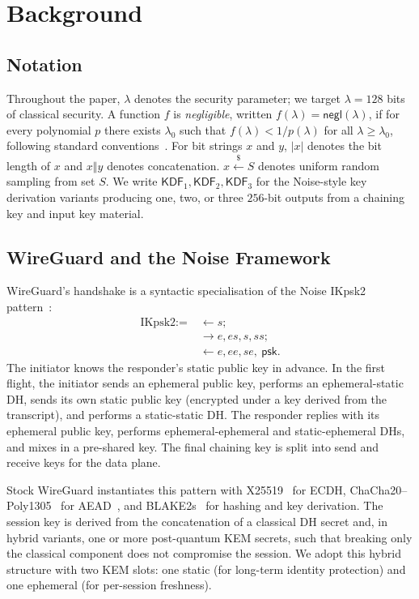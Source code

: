 \documentclass{SCIS2026}
\newcommand{\concat}{\mathbin{\Vert}}
\newcommand{\negl}{\mathsf{negl}}
\newcommand{\KDF}{\mathsf{KDF}}
\begin{document}
\section{Background}
\label{sec:bg}

\subsection{Notation}
\label{sec:notation}

Throughout the paper, $\lambda$ denotes the security parameter; we
target $\lambda = 128$ bits of classical security.  A function $f$
is \emph{negligible}, written $f(\lambda) = \negl(\lambda)$, if for
every polynomial $p$ there exists $\lambda_0$ such that
$f(\lambda) < 1/p(\lambda)$ for all $\lambda \geq \lambda_0$, following
standard conventions~\cite{21}.  For
bit strings $x$ and $y$, $|x|$ denotes the bit length of $x$ and
$x \concat y$ denotes concatenation.  $x \xleftarrow{\$} S$ denotes
uniform random sampling from set $S$.  We write $\KDF_1, \KDF_2,
\KDF_3$ for the Noise-style key derivation variants producing one,
two, or three $256$-bit outputs from a chaining key and input key
material.

\subsection{WireGuard and the Noise Framework}
\label{sec:wireguard}

WireGuard's handshake is a syntactic specialisation of the Noise
\textsf{IKpsk2} pattern~\cite{2}:
\begin{align*}
\text{IKpsk2} :=\;& \leftarrow s; \\
              & \to e, es, s, ss; \\
              & \leftarrow e, ee, se,\ \mathsf{psk}.
\end{align*}
The initiator knows the responder's static public key in advance.
In the first flight, the initiator sends an ephemeral public key,
performs an ephemeral-static DH, sends its own static public key
(encrypted under a key derived from the transcript), and performs a
static-static DH.  The responder replies with its ephemeral public
key, performs ephemeral-ephemeral and static-ephemeral DHs, and
mixes in a pre-shared key.  The final chaining key is split into
send and receive keys for the data plane.

Stock WireGuard instantiates this pattern with X25519~\cite{4}
for ECDH, ChaCha20--Poly1305~\cite{5} for
AEAD~\cite{22,23}, and
BLAKE2s~\cite{6} for hashing and key derivation.
The session key is derived from the concatenation of a classical DH
secret and, in hybrid variants, one or more post-quantum KEM secrets,
such that breaking only the classical component does not compromise
the session.  We adopt this hybrid structure with two KEM slots: one
static (for long-term identity protection) and one ephemeral (for
per-session freshness).
\end{document}

